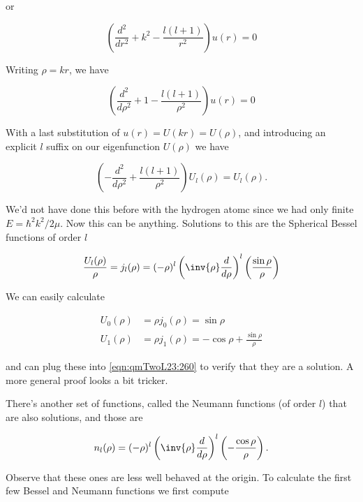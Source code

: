 or

\begin{equation}\label{eqn:qmTwoL23:220}
\left( \frac{d^2}{dr^2} + k^2 -\frac{l (l+1) }{r^2} \right) u(r) = 0
\end{equation}

Writing $\rho = k r$, we have

\begin{equation}\label{eqn:qmTwoL23:240}
\left( \frac{d^2}{d\rho^2} + 1 -\frac{l (l+1) }{\rho^2} \right) u(r) = 0
\end{equation}

With a last substitution of $u(r) = U( k r ) = U(\rho)$, and introducing an explicit $l$ suffix on our eigenfunction $U(\rho)$ we have

\begin{equation}\label{eqn:qmTwoL23:260}
\left( -\frac{d^2}{d\rho^2} +\frac{l (l+1) }{\rho^2} \right) U_l(\rho) = U_l(\rho).
\end{equation}

We'd not have done this before with the hydrogen atomc since we had only finite $E = \hbar^2 k^2/2 \mu$.  Now this can be anything.  Solutions to this are the Spherical Bessel functions of order $l$

\begin{equation}\label{eqn:qmTwoL23:280}
\frac{U_l(\rho)}{\rho} = j_l(\rho) = (-\rho)^l \left( \inv{\rho} \frac{d}{d\rho} \right)^l \left( \frac{\sin\rho}{\rho} \right)
\end{equation}

We can easily calculate

\begin{align}\label{eqn:qmTwoL23:300}
U_0(\rho) &= \rho j_0(\rho) = \sin\rho \\
U_1(\rho) &= \rho j_1(\rho) = -\cos\rho + \frac{\sin\rho}{\rho}
\end{align}

and can plug these into \ref{eqn:qmTwoL23:260} to verify that they are a solution.  A more general proof looks a bit tricker.

There's another set of functions, called the Neumann functions (of order $l$) that are also solutions, and those are

\begin{equation}\label{eqn:qmTwoL23:320}
n_l(\rho) = (-\rho)^l \left( \inv{\rho} \frac{d}{d\rho} \right)^l \left( -\frac{\cos\rho}{\rho} \right).
\end{equation}

Observe that these ones are less well behaved at the origin.  To calculate the first few Bessel and Neumann functions we first compute

